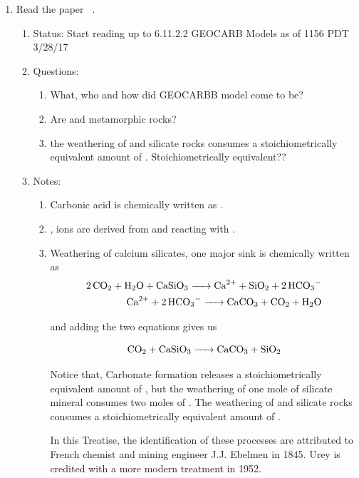 \begin{enumerate}
  \item Read the paper ~\citet{RDL:2014}. 
    \begin{enumerate}
      \item Status: Start reading up to 6.11.2.2 GEOCARB Models as of 1156 PDT 3/28/17
      \item Questions:
        \begin{enumerate} 
          \item What, who and how did GEOCARBB model come to be?         
          \item Are  and  metamorphic rocks?
          \item the weathering of  and  silicate rocks consumes a stoichiometrically equivalent amount of . Stoichiometrically equivalent??
        \end{enumerate}
     \item Notes:
        \begin{enumerate}
          \item Carbonic acid is chemically written as . 
          \item {},  ions are derived from  and  reacting with .
          \item Weathering of calcium silicates, one major  sink is chemically written as \\
          \begin{eqnarray}
            \ce{2CO2 + H2O + CaSiO3 -> Ca^{2+} + SiO2 + 2HCO3^-} \\
            \ce{Ca^{2+} + 2HCO3^- -> CaCO3 + CO2 + H2O} 
          \end{eqnarray}
          
          and adding the two equations gives us

          \begin{equation}
            \ce{CO2 + CaSiO3 -> CaCO3 + SiO2}
          \end{equation}
     
          Notice that, Carbonate formation releases a stoichiometrically equivalent amount of  , but the weathering of one mole of silicate mineral consumes two moles of . The weathering of  and  silicate rocks consumes a stoichiometrically equivalent amount of .
      		   
          In this Treatise, the identification of these processes are attributed to French chemist and mining engineer J.J. Ebelmen in 1845. Urey is credited with a more modern treatment in 1952.


\end{enumerate}
\end{enumerate}
\end{enumerate}
